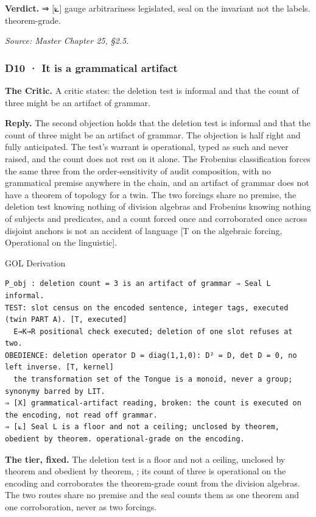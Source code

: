 \documentclass[10pt,twocolumn]{article}
\begin{document}
\textbf{Verdict.} ⇒ {[}⟀{]} gauge arbitrariness legislated, seal on the
invariant not the labels. theorem-grade.

\emph{Source: Master Chapter 25, §2.5.}

\hypertarget{d10-it-is-a-grammatical-artifact}{%
\subsubsection{D10 · It is a grammatical
artifact}\label{d10-it-is-a-grammatical-artifact}}

\textbf{The Critic.} A critic states: the deletion test is informal and
that the count of three might be an artifact of grammar.

\textbf{Reply.} The second objection holds that the deletion test is
informal and that the count of three might be an artifact of grammar.
The objection is half right and fully anticipated. The test's warrant is
operational, typed as such and never raised, and the count does not rest
on it alone. The Frobenius classification forces the same three from the
order-sensitivity of audit composition, with no grammatical premise
anywhere in the chain, and an artifact of grammar does not have a
theorem of topology for a twin. The two forcings share no premise, the
deletion test knowing nothing of division algebras and Frobenius knowing
nothing of subjects and predicates, and a count forced once and
corroborated once across disjoint anchors is not an accident of language
{[}T on the algebraic forcing, Operational on the linguistic{]}.

\begin{golbox}{GOL Derivation}
\begin{lstlisting}[style=golv]
P_obj : deletion count = 3 is an artifact of grammar ⇒ Seal L informal.
TEST: slot census on the encoded sentence, integer tags, executed (twin PART A). [T, executed]
  E→K→R positional check executed; deletion of one slot refuses at two.
OBEDIENCE: deletion operator D = diag(1,1,0): D² = D, det D = 0, no left inverse. [T, kernel]
  the transformation set of the Tongue is a monoid, never a group; synonymy barred by LIT.
⇒ [X] grammatical-artifact reading, broken: the count is executed on the encoding, not read off grammar.
⇒ [⟀] Seal L is a floor and not a ceiling; unclosed by theorem, obedient by theorem. operational-grade on the encoding.
\end{lstlisting}
\end{golbox}

\textbf{The tier, fixed.} The deletion test is a floor and not a
ceiling, unclosed by theorem and obedient by theorem,
\texttt{}; its count
of three is operational on the encoding and corroborates the
theorem-grade count from the division algebras. The two routes share no
premise and the seal counts them as one theorem and one corroboration,
never as two forcings.
\end{document}
